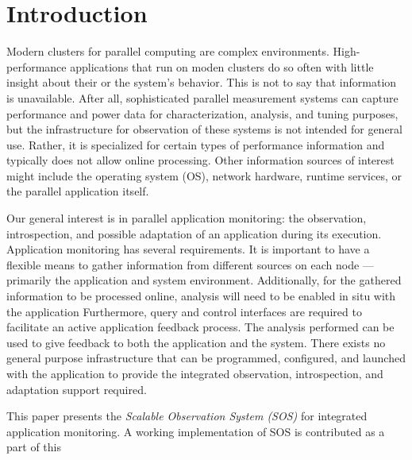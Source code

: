 \section{Introduction}
%
\par
%
Modern clusters for parallel computing are complex environments.
%
High-performance applications that run on moden clusters do so often with
little insight about their or the system's behavior.
%
This is not to say that information is unavailable. 
%
After all, sophisticated parallel measurement systems can capture performance and
power data for characterization, analysis, and tuning purposes, but
the infrastructure for observation of these systems is not intended
for general use.
%
Rather, it is specialized for certain types of performance information
and typically does not allow online processing.
%
Other information sources of interest might include the
operating system (OS), network hardware, runtime services, or the
parallel application itself.
%
\par
%
Our general interest is in parallel application monitoring: the
observation, introspection, and possible adaptation of an application
during its execution.
%
Application monitoring has several requirements.
%
%
It is important to have a flexible means to gather information from
different sources on each node --- primarily the application and
system environment.
%
%
Additionally, for the gathered information to be processed online,
analysis will need to be enabled in situ with the application
%
%
Furthermore, query and control interfaces are required to facilitate
an active application feedback process.
%
The analysis performed can be used to give feedback to both the
application and the system.
%
There exists no general purpose infrastructure that can be programmed,
configured, and launched with the application to provide the
integrated observation, introspection, and adaptation support
required.
%
\par
%
This paper presents the \textit{Scalable Observation System (SOS)} for
integrated application monitoring.
%
A working implementation of SOS is contributed as a part of this
